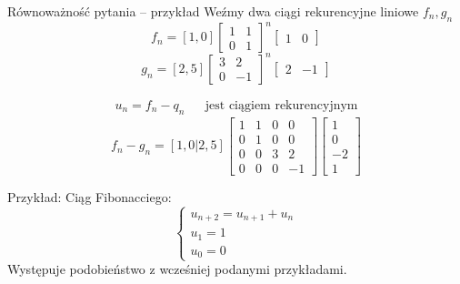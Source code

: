 \documentclass[handout]{beamer}
\theoremstyle{definition}
\theoremstyle{named}
\begin{document}
\begin{frame}{Równoważność pytania -- przykład}
Weźmy dwa ciągi rekurencyjne liniowe $f_n, g_n$
    \begin{equation*}
        f_{n} = [1,0] \begin{bmatrix}
            1 & 1 \\
            0 & 1 
        \end{bmatrix}^{n}
        \begin{bmatrix}
            1 & 0
        \end{bmatrix}
    \end{equation*}
    \begin{equation*}
         g_{n} = [2,5] \begin{bmatrix}
            3 & 2 \\
            0 & -1 
        \end{bmatrix}^{n}
        \begin{bmatrix}
            2 & -1
        \end{bmatrix}
    \end{equation*}
    
    \begin{align*}
        u_n = f_n - q_n && \text{jest ciągiem rekurencyjnym} 
    \end{align*}
    $$
        f_n - g_n = [1,0|2,5] 
        \left[
        \begin{array}{cc|cc}
        1 & 1 & 0 & 0 \\
        0 & 1 & 0 & 0 \\
        \hline
        0 & 0 & 3 & 2 \\
        0 & 0 & 0 & -1
        \end{array}
        \right]
        \begin{bmatrix}
            1  \\
            0  \\
            \hline
            -2 \\
            1 
        \end{bmatrix}
    $$
    
\end{frame}


\begin{frame}
    Przykład:
    Ciąg Fibonacciego:
   \begin{equation*}
        \begin{cases}
        u_{n+2} = u_{n+1} + u_n \\
        u_{1} = 1 \\
        u_{0} = 0
        \end{cases}
    \end{equation*}
    Występuje podobieństwo z wcześniej podanymi przykładami. 

\end{frame}
\end{document}
